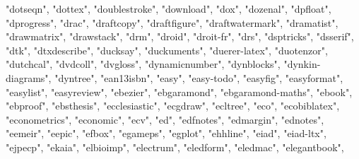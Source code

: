 \documentclass[
]{article}
\newenvironment{Shaded}{\begin{snugshade}}{\end{snugshade}}
\newcommand{\NormalTok}[1]{#1}
\newcommand{\StringTok}[1]{\textcolor[rgb]{0.31,0.60,0.02}{#1}}
\begin{document}
\begin{Shaded}
\begin{Highlighting}[]
\StringTok{"dotseqn"}\NormalTok{, }\StringTok{"dottex"}\NormalTok{, }\StringTok{"doublestroke"}\NormalTok{, }\StringTok{"download"}\NormalTok{, }\StringTok{"dox"}\NormalTok{, }\StringTok{"dozenal"}\NormalTok{, }
\StringTok{"dpfloat"}\NormalTok{, }\StringTok{"dprogress"}\NormalTok{, }\StringTok{"drac"}\NormalTok{, }\StringTok{"draftcopy"}\NormalTok{, }\StringTok{"draftfigure"}\NormalTok{, }\StringTok{"draftwatermark"}\NormalTok{, }
\StringTok{"dramatist"}\NormalTok{, }\StringTok{"drawmatrix"}\NormalTok{, }\StringTok{"drawstack"}\NormalTok{, }\StringTok{"drm"}\NormalTok{, }\StringTok{"droid"}\NormalTok{, }\StringTok{"droit{-}fr"}\NormalTok{, }
\StringTok{"drs"}\NormalTok{, }\StringTok{"dsptricks"}\NormalTok{, }\StringTok{"dsserif"}\NormalTok{, }\StringTok{"dtk"}\NormalTok{, }\StringTok{"dtxdescribe"}\NormalTok{, }\StringTok{"ducksay"}\NormalTok{, }
\StringTok{"duckuments"}\NormalTok{, }\StringTok{"duerer{-}latex"}\NormalTok{, }\StringTok{"duotenzor"}\NormalTok{, }\StringTok{"dutchcal"}\NormalTok{, }\StringTok{"dvdcoll"}\NormalTok{, }
\StringTok{"dvgloss"}\NormalTok{, }\StringTok{"dynamicnumber"}\NormalTok{, }\StringTok{"dynblocks"}\NormalTok{, }\StringTok{"dynkin{-}diagrams"}\NormalTok{, }\StringTok{"dyntree"}\NormalTok{, }
\StringTok{"ean13isbn"}\NormalTok{, }\StringTok{"easy"}\NormalTok{, }\StringTok{"easy{-}todo"}\NormalTok{, }\StringTok{"easyfig"}\NormalTok{, }\StringTok{"easyformat"}\NormalTok{, }\StringTok{"easylist"}\NormalTok{, }
\StringTok{"easyreview"}\NormalTok{, }\StringTok{"ebezier"}\NormalTok{, }\StringTok{"ebgaramond"}\NormalTok{, }\StringTok{"ebgaramond{-}maths"}\NormalTok{, }\StringTok{"ebook"}\NormalTok{, }
\StringTok{"ebproof"}\NormalTok{, }\StringTok{"ebsthesis"}\NormalTok{, }\StringTok{"ecclesiastic"}\NormalTok{, }\StringTok{"ecgdraw"}\NormalTok{, }\StringTok{"ecltree"}\NormalTok{, }
\StringTok{"eco"}\NormalTok{, }\StringTok{"ecobiblatex"}\NormalTok{, }\StringTok{"econometrics"}\NormalTok{, }\StringTok{"economic"}\NormalTok{, }\StringTok{"ecv"}\NormalTok{, }\StringTok{"ed"}\NormalTok{, }
\StringTok{"edfnotes"}\NormalTok{, }\StringTok{"edmargin"}\NormalTok{, }\StringTok{"ednotes"}\NormalTok{, }\StringTok{"eemeir"}\NormalTok{, }\StringTok{"eepic"}\NormalTok{, }\StringTok{"efbox"}\NormalTok{, }
\StringTok{"egameps"}\NormalTok{, }\StringTok{"egplot"}\NormalTok{, }\StringTok{"ehhline"}\NormalTok{, }\StringTok{"eiad"}\NormalTok{, }\StringTok{"eiad{-}ltx"}\NormalTok{, }\StringTok{"ejpecp"}\NormalTok{, }
\StringTok{"ekaia"}\NormalTok{, }\StringTok{"elbioimp"}\NormalTok{, }\StringTok{"electrum"}\NormalTok{, }\StringTok{"eledform"}\NormalTok{, }\StringTok{"eledmac"}\NormalTok{, }\StringTok{"elegantbook"}\NormalTok{, }

\end{Highlighting}
\end{Shaded}
\end{document}
